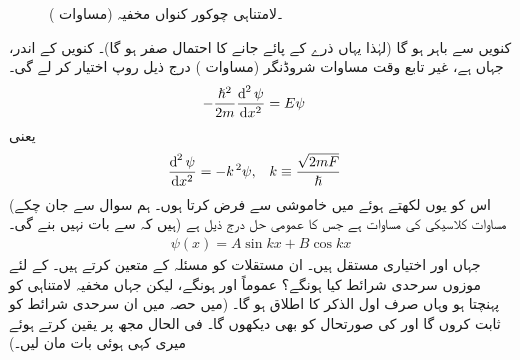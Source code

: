 \begin{figure}
\centering
{}
\caption{۔لامتناہی چوکور کنواں مخفیہ (مساوات )}
\label{شکل_غیر_تابع_لامتناہی_چکور_کنواں_مخفیہ}
\end{figure}
کنویں سے باہر  ہو گا (لہٰذا یہاں ذرے کے پائے جانے کا احتمال صفر ہو گا)۔ کنویں کے اندر، جہاں  ہے، غیر تابع وقت مساوات شروڈنگر (مساوات ) درج ذیل روپ اختیار کر لے گی۔
\begin{align}
-\frac{\hslash^{2}}{2m}\frac{\dif^{\,2}\psi}{\dif x^{2}}&=E\psi
\end{align} 
یعنی
\begin{align}\label{مساوات_شروڈنگر_کلاسیکی_ہارمونی_مرتعش}
\frac{\dif^{\,2}\psi}{\dif x^{2}}&=-k^{\,2}\psi, && k\equiv \frac{\sqrt{2mF}}{\hslash}
\end{align}
(اس کو یوں لکھتے ہوئے میں خاموشی سے  فرض کرتا ہوں۔ ہم سوال  سے جان چکے ہیں کہ  سے بات نہیں بنے گی۔) مساوات  کلاسیکی  کی مساوات ہے جس کا عمومی حل درج ذیل ہے
\begin{align}
\psi(x)=A\sin kx+B\cos kx
\end{align}
 جہاں  اور  اختیاری مستقل ہیں۔ ان مستقلات کو مسئلہ کے متعین کرتے ہیں۔  کے لئے موزوں سرحدی شرائط کیا ہونگے؟ عموماً  اور   ہونگے، لیکن جہاں مخفیہ لامتناہی کو پہنچتا ہو وہاں صرف اول الذکر کا اطلاق ہو گا۔ (میں حصہ میں ان سرحدی شرائط کو ثابت کروں گا اور  کی صورتحال کو بھی دیکھوں گا۔ فی الحال مجھ پر یقین کرتے ہوئے میری کہی ہوئی بات مان لیں۔) 

